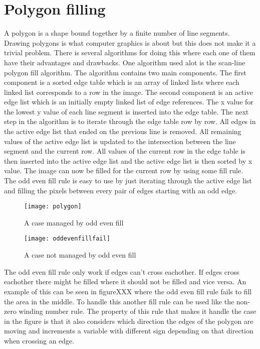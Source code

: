 \section{Polygon filling}
A polygon is a shape bound together by a finite number of line segments. Drawing polygons is what computer graphics is about but this does not make it a trivial problem. There is several algorithms for doing this where each one of them have their advantages and drawbacks. One algorithm used alot is the scan-line polygon fill algorithm. The algorithm contains two main components. The first component is a sorted edge table which is an array of linked lists where each linked list corresponds to a row in the image. The second component is an active edge list which is an initially empty linked list of edge references. The x value for the lowest y value of each line segment is inserted into the edge table. The next step in the algorithm is to iterate through the edge table row by row. All edges in the active edge list that ended on the previous line is removed. All remaining values of the active edge list is updated to the intersection between the line segment and the current row. All values of the current row in the edge table is then inserted into the active edge list and the active edge list is then sorted by x value. The image can now be filled for the current row by using some fill rule. The odd even fill rule is easy to use by just iterating through the active edge list and filling the pixels between every pair of edges starting with an odd edge.

\begin{figure}[H]
  \texttt{[image: polygon]}
  \caption{A case managed by odd even fill}\label{fig:awesome_image1}
\endminipage\hfill
{}
  \texttt{[image: oddevenfillfail]}
  \caption{A case not managed by odd even fill}\label{fig:awesome_image2}
\endminipage\hfill
\end{figure}

The odd even fill rule only work if edges can't cross eachother. If edges cross eachother there might be filled where it should not be filled and vice versa. An example of this can be seen in figureXXX
where the odd even fill rule fails to fill the area in the middle. To handle this another fill rule can be used like the non-zero winding number rule. The property of this rule that makes it handle the case in the figure is that it also considers which direction the edges of the polygon are moving and increments a variable with different sign depending on that direction when crossing an edge.
